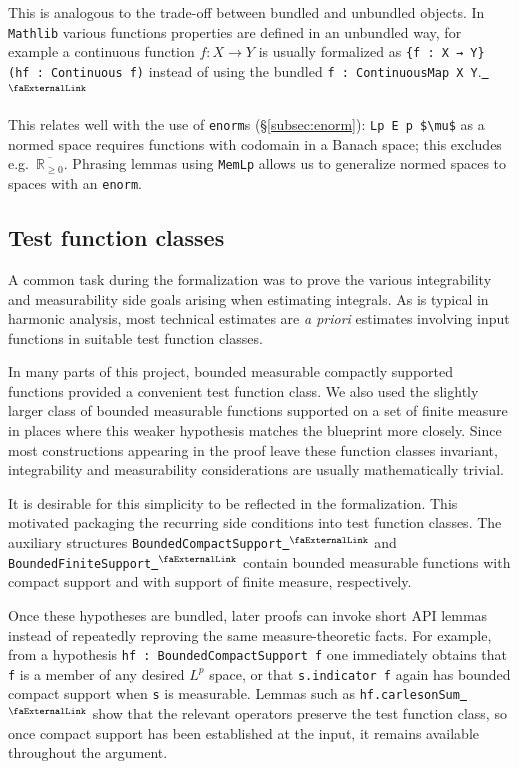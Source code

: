\documentclass[12pt, reqno]{amsart}
\let\lean\lstinline
\def\mmlean{\lstinline[mathescape]}
\newcommand*{\real}{\mathbb{R}} %
\newcommand{\ennreal}{\overline{\real_{\ge0}}}
\newcommand{\mathlib}{\texttt{Mathlib}\xspace}
\newcommand{\extlink}{~\ensuremath{{}^\text{\faExternalLink}}}
\theoremstyle{definition}
\theoremstyle{plain}
\begin{document}
This is analogous to the trade-off between bundled and unbundled objects.
In \mathlib various functions properties are defined in an unbundled way, for example a continuous function $f\colon X \to Y$ is usually formalized as \lstinline|{f : X → Y} (hf : Continuous f)| instead of using the bundled \lean{f : ContinuousMap X Y}.\href{https://github.com/leanprover-community/mathlib4/blob/b63493a4746b4651fceb3bcf3a4651cc36a4b8de/Mathlib/Topology/ContinuousMap/Defs.lean#L33-L37}{\extlink}

This relates well with the use of \lean{enorm}s (\S\ref{subsec:enorm}): \mmlean{Lp E p $\mu$} as a normed space requires functions with codomain in a Banach space; this excludes e.g.\ $\ennreal$.
Phrasing lemmas using \lean{MemLp} allows us to generalize normed spaces to spaces with an \lean{enorm}.

\subsection{Test function classes}\label{subsec:bdd_comp_supp}
A common task during the formalization was to prove the various integrability and measurability side goals
arising when estimating integrals.
As is typical in harmonic analysis, most technical estimates are {\it a priori} estimates involving
input functions in suitable test function classes.

In many parts of this project, bounded measurable compactly supported functions provided a convenient
test function class. We also used the slightly larger class
of bounded measurable functions supported on a set of finite measure in places where this weaker hypothesis
matches the blueprint more closely.
Since most constructions appearing in the proof leave these function classes invariant,
integrability and measurability considerations are usually mathematically trivial.

It is desirable for this simplicity to be reflected in the formalization.
This motivated packaging the recurring side conditions into test function classes.
The auxiliary structures \lean{BoundedCompactSupport}\href{https://github.com/fpvandoorn/carleson/blob/AFM-frozen/Carleson/ToMathlib/BoundedCompactSupport.lean#L84-L87}{\extlink}
and \lean{BoundedFiniteSupport}\href{https://github.com/fpvandoorn/carleson/blob/AFM-frozen/Carleson/Defs.lean#L74-L76}{\extlink}
contain bounded measurable functions with compact support and with support of finite measure, respectively.

Once these hypotheses are bundled, later proofs can invoke short API lemmas instead of repeatedly
reproving the same measure-theoretic facts. For example, from a hypothesis
\lean{hf : BoundedCompactSupport f} one immediately obtains that \lean{f} is a member of
any desired $L^p$ space,
or that \lean{s.indicator f} again has bounded compact support when \lean{s} is measurable.
Lemmas such as \lean{hf.carlesonSum}\href{https://github.com/fpvandoorn/carleson/blob/AFM-frozen/Carleson/Operators.lean#L164-L165}{\extlink} show that the relevant
operators preserve the test function class, so once compact support has been established at the input, it remains available throughout the argument.
\end{document}
